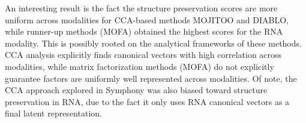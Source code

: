 An interesting result is the fact the structure preservation scores are more uniform across modalities for CCA-based methods MOJITOO and DIABLO, while runner-up methods (MOFA) obtained the highest scores for the RNA modality. This is possibly rooted on the analytical frameworks of these methods. CCA analysis explicitly finds canonical vectors with high correlation across modalities, while matrix factorization methods (MOFA) do not explicitly guarantee factors are uniformly well represented across modalities. Of note, the CCA approach explored in Symphony was also biased toward structure preservation in RNA, due to the fact it only uses RNA canonical vectors as a final latent representation.
